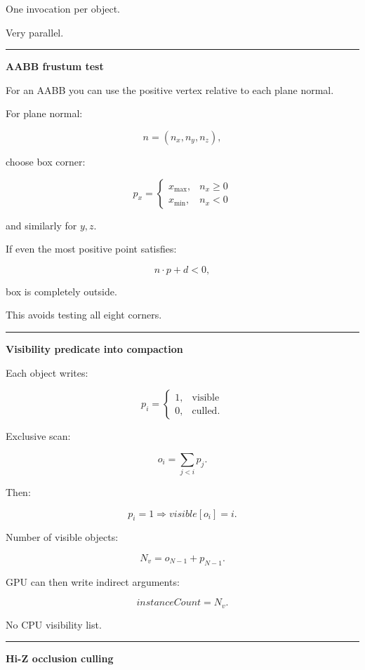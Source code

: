 One invocation per object.

Very parallel.

\begin{center}\rule{0.5\linewidth}{0.5pt}\end{center}

\textbf{AABB frustum test}

For an AABB you can use the positive vertex relative to each plane normal.

For plane normal:

\[
n=(n_x,n_y,n_z),
\]

choose box corner:

\[
p_x=
\begin{cases}
x_{\max},&n_x\ge0\\
x_{\min},&n_x<0
\end{cases}
\]

and similarly for \(y,z\).

If even the most positive point satisfies:

\[
n\cdot p+d<0,
\]

box is completely outside.

This avoids testing all eight corners.

\begin{center}\rule{0.5\linewidth}{0.5pt}\end{center}

\textbf{Visibility predicate into compaction}

Each object writes:

\[
p_i=
\begin{cases}
1,&\text{visible}\\
0,&\text{culled}.
\end{cases}
\]

Exclusive scan:

\[
o_i=
\sum_{j<i}p_j.
\]

Then:

\[
p_i=1
\Rightarrow
visible[o_i]=i.
\]

Number of visible objects:

\[
N_v=
o_{N-1}+p_{N-1}.
\]

GPU can then write indirect arguments:

\[
instanceCount=N_v.
\]

No CPU visibility list.

\begin{center}\rule{0.5\linewidth}{0.5pt}\end{center}

\textbf{Hi-Z occlusion culling}

